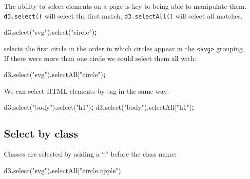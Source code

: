 \documentclass[
  openany]{book}
\newenvironment{Shaded}{\begin{snugshade}}{\end{snugshade}}
\newcommand{\FunctionTok}[1]{\textcolor[rgb]{0.00,0.00,0.00}{#1}}
\newcommand{\NormalTok}[1]{#1}
\newcommand{\OperatorTok}[1]{\textcolor[rgb]{0.81,0.36,0.00}{\textbf{#1}}}
\newcommand{\StringTok}[1]{\textcolor[rgb]{0.31,0.60,0.02}{#1}}
\begin{document}
The ability to select elements on a page is key to being able to manipulate them. \texttt{d3.select()} will select the first match; \texttt{d3.selectAll()} will select all matches.

\begin{Shaded}
\begin{Highlighting}[]
\NormalTok{d3}\OperatorTok{.}\FunctionTok{select}\NormalTok{(}\StringTok{"svg"}\NormalTok{)}\OperatorTok{.}\FunctionTok{select}\NormalTok{(}\StringTok{"circle"}\NormalTok{)}\OperatorTok{;}
\end{Highlighting}
\end{Shaded}

selects the first circle in the order in which circles appear in the \texttt{\textless{}svg\textgreater{}} grouping. If there were more than one circle we could select them all with:

\begin{Shaded}
\begin{Highlighting}[]
\NormalTok{d3}\OperatorTok{.}\FunctionTok{select}\NormalTok{(}\StringTok{"svg"}\NormalTok{)}\OperatorTok{.}\FunctionTok{selectAll}\NormalTok{(}\StringTok{"circle"}\NormalTok{)}\OperatorTok{;}
\end{Highlighting}
\end{Shaded}

We can select HTML elements by tag in the same way:

\begin{Shaded}
\begin{Highlighting}[]
\NormalTok{d3}\OperatorTok{.}\FunctionTok{select}\NormalTok{(}\StringTok{"body"}\NormalTok{)}\OperatorTok{.}\FunctionTok{select}\NormalTok{(}\StringTok{"h1"}\NormalTok{)}\OperatorTok{;}
\NormalTok{d3}\OperatorTok{.}\FunctionTok{select}\NormalTok{(}\StringTok{"body"}\NormalTok{)}\OperatorTok{.}\FunctionTok{selectAll}\NormalTok{(}\StringTok{"h1"}\NormalTok{)}\OperatorTok{;}
\end{Highlighting}
\end{Shaded}

\hypertarget{select-by-class}{%
\subsection{Select by class}\label{select-by-class}}

Classes are selected by adding a ``.'' before the class name:

\begin{Shaded}
\begin{Highlighting}[]
\NormalTok{d3}\OperatorTok{.}\FunctionTok{select}\NormalTok{(}\StringTok{"svg"}\NormalTok{)}\OperatorTok{.}\FunctionTok{selectAll}\NormalTok{(}\StringTok{"circle.apple"}\NormalTok{)}
\end{Highlighting}
\end{Shaded}
\end{document}

